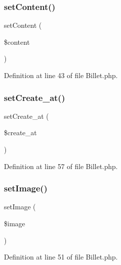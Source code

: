 \subsubsection{set\+Content()}
{\footnotesize\ttfamily set\+Content (\begin{DoxyParamCaption}\item[{}]{\$content }\end{DoxyParamCaption})}



Definition at line 43 of file Billet.\+php.

\mbox{\label{class_src_1_1_entity_1_1_billet_ad12db04fd7abd82e8172ebee19c45ff1}} 
\subsubsection{set\+Create\+\_\+at()}
{\footnotesize\ttfamily set\+Create\+\_\+at (\begin{DoxyParamCaption}\item[{Date\+Time}]{\$create\+\_\+at }\end{DoxyParamCaption})}



Definition at line 57 of file Billet.\+php.

\mbox{\label{class_src_1_1_entity_1_1_billet_af785d0fb8da1ba24ec74c2f9f7e27c0a}} 
\subsubsection{set\+Image()}
{\footnotesize\ttfamily set\+Image (\begin{DoxyParamCaption}\item[{}]{\$image }\end{DoxyParamCaption})}



Definition at line 51 of file Billet.\+php.

\mbox{\label{class_src_1_1_entity_1_1_billet_a9f9f5983de6ae197176a80f55f113a6c}} 
